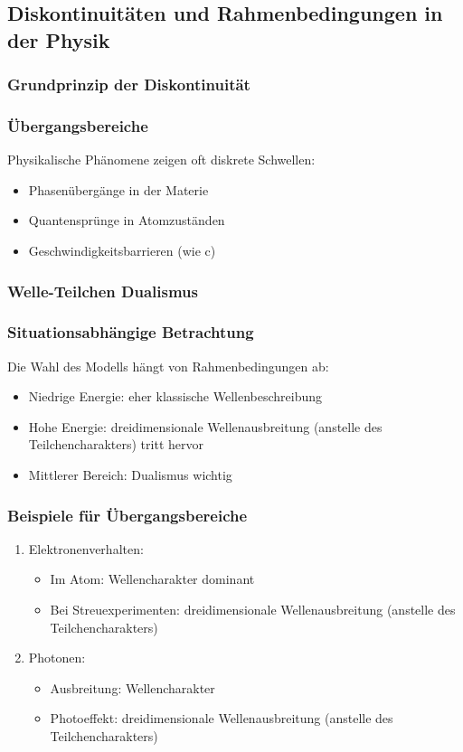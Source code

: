 \documentclass[12pt,a4paper]{article}
\begin{document}
	
	
	\subsection{Diskontinuitäten und Rahmenbedingungen in der Physik}
	
	\subsubsection{Grundprinzip der Diskontinuität}
	
	\subsubsection{Übergangsbereiche}
	Physikalische Phänomene zeigen oft diskrete Schwellen:
	\begin{itemize}
		\item Phasenübergänge in der Materie
		\item Quantensprünge in Atomzuständen
		\item Geschwindigkeitsbarrieren (wie c)
	\end{itemize}
	
	\subsubsection{Welle-Teilchen Dualismus}
	
	\subsubsection{Situationsabhängige Betrachtung}
	Die Wahl des Modells hängt von Rahmenbedingungen ab:
	\begin{itemize}
		\item Niedrige Energie: eher klassische Wellenbeschreibung
		\item Hohe Energie: dreidimensionale Wellenausbreitung (anstelle des Teilchencharakters) tritt hervor
		\item Mittlerer Bereich: Dualismus wichtig
	\end{itemize}
	
	\subsubsection{Beispiele für Übergangsbereiche}
	\begin{enumerate}
		\item Elektronenverhalten:
		\begin{itemize}
			\item Im Atom: Wellencharakter dominant
			\item Bei Streuexperimenten: dreidimensionale Wellenausbreitung (anstelle des Teilchencharakters)
		\end{itemize}
		\item Photonen:
		\begin{itemize}
			\item Ausbreitung: Wellencharakter
			\item Photoeffekt: dreidimensionale Wellenausbreitung (anstelle des Teilchencharakters)
		\end{itemize}
	\end{enumerate}
	
\end{document}

